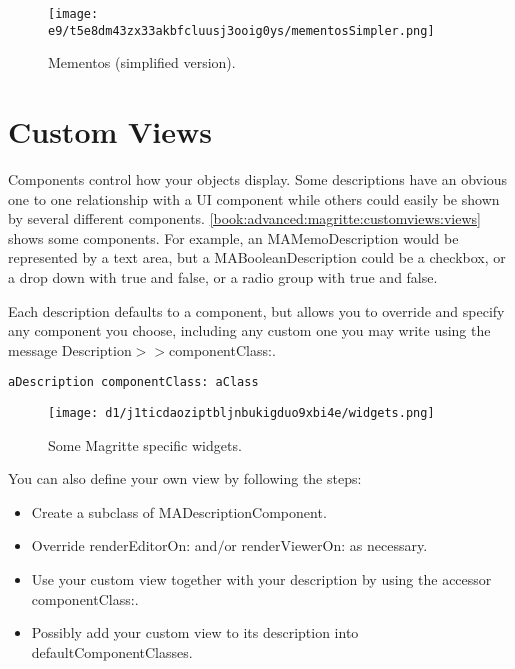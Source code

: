 \documentclass[a4paper,10pt,twoside]{book}
\newcommand{\ct}[1]{{\small\ttfamily\textup{#1}}}
\begin{document}
\begin{figure}[h!tbp]
	\begin{center}
		\texttt{[image: e9/t5e8dm43zx33akbfcluusj3ooig0ys/mementosSimpler.png]}
		\caption{Mementos (simplified version).\label{book:advanced:magritte:accessorsmementos:mementosSimpler}}
	\end{center}
\end{figure}


\section{Custom Views}
\label{book:advanced:magritte:customviews}

Components control how your objects display. Some  descriptions have an obvious one to one relationship with a UI component while others could easily be shown by several different components. \autoref{book:advanced:magritte:customviews:views} shows some components. For example, an \ct{MAMemoDescription} would be represented by a text area, but a \ct{MABooleanDescription} could be a checkbox, or a drop down with true and false, or a radio group with true and false. 
 
Each description defaults to a component, but allows you to override and specify any component you  choose, including any custom one you may write using the message  \ct{Description$>$$>$componentClass:}. 

\begin{lstlisting}
aDescription componentClass: aClass
\end{lstlisting}

\begin{figure}[h!tbp]
	\begin{center}
		\texttt{[image: d1/j1ticdaoziptbljnbukigduo9xbi4e/widgets.png]}
		\caption{Some Magritte specific widgets.\label{book:advanced:magritte:customviews:views}}
	\end{center}
\end{figure}


You can also define your own view by following the steps: 

\begin{itemize}
\item  Create a subclass of \ct{MADescriptionComponent}.
\item  Override \ct{renderEditorOn:} and$/$or \ct{renderViewerOn:} as necessary.
\item  Use your custom view together with your description by using the accessor \ct{componentClass:}. 
\item  Possibly add your custom view to its description into \ct{defaultComponentClasses}. 
\end{itemize}
\end{document}
